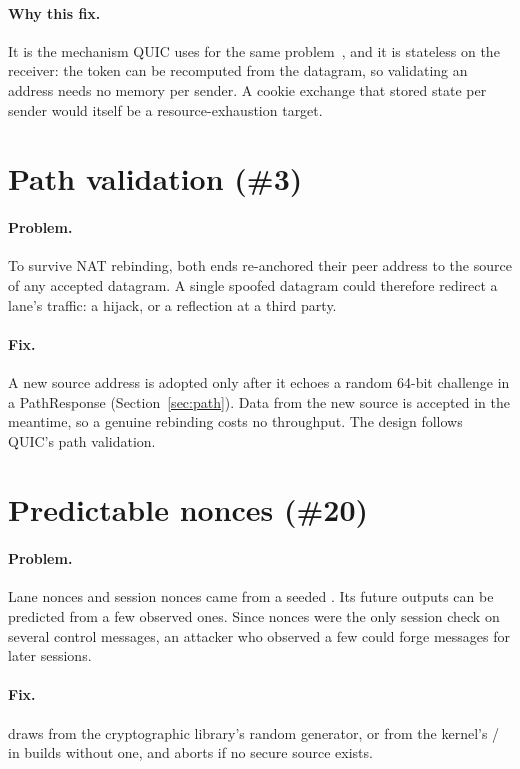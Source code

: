 \paragraph{Why this fix.} It is the mechanism QUIC uses for the same problem~\cite{rfc9000}, and it is
stateless on the receiver: the token can be recomputed from the datagram, so validating an address needs no
memory per sender. A cookie exchange that stored state per sender would itself be a resource-exhaustion
target.

\section{Path validation (\#3)}

\paragraph{Problem.} To survive NAT rebinding, both ends re-anchored their peer address to the source of any
accepted datagram. A single spoofed datagram could therefore redirect a lane's traffic: a hijack, or a
reflection at a third party.

\paragraph{Fix.} A new source address is adopted only after it echoes a random 64-bit challenge in a
PathResponse (Section~\ref{sec:path}). Data from the new source is accepted in the meantime, so a genuine
rebinding costs no throughput. The design follows QUIC's path validation.

\section{Predictable nonces (\#20)}

\paragraph{Problem.} Lane nonces and session nonces came from a seeded . Its future outputs can
be predicted from a few observed ones. Since nonces were the only session check on several control messages, an
attacker who observed a few could forge messages for later sessions.

\paragraph{Fix.}  draws from the cryptographic library's random generator, or from the
kernel's / in builds without one, and aborts if no secure source exists.

